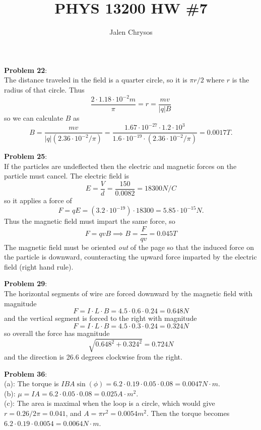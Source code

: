 \documentclass{amsart}
\title{PHYS 13200 HW \#7}
\author{Jalen Chrysos}
\begin{document}
	\maketitle
	
	\textbf{Problem 22}:\\
	
	The distance traveled in the field is a quarter circle, so it is $\pi r / 2$ where $r$ is the radius of that circle. Thus
	$$
	\frac{2\cdot 1.18\cdot 10^{-2} m}{\pi} = r = \frac{m v }{|q| B}
	$$
	so we can calculate $B$ as 
	$$
	B = \frac{mv}{|q| (2.36 \cdot 10^{-2} / \pi)} = \frac{1.67 \cdot 10^{-27} \cdot 1.2 \cdot 10^3}{1.6\cdot 10^{-19} \cdot (2.36 \cdot 10^{-2} / \pi)} = 0.0017 T.
	$$
	
	\textbf{Problem 25}:\\
	
	If the particles are undeflected then the electric and magnetic forces on the particle must cancel. The electric field is 
	$$
	E = \frac{V}{d} = \frac{150}{0.0082} = 18300 N/C
	$$
	so it applies a force of 
	$$
	F = qE = (3.2 \cdot 10^{-19})\cdot 18300 = 5.85 \cdot 10^{-15} N.
	$$
	Thus the magnetic field must impart the same force, so 
	$$
	F = qvB \implies B = \frac{F}{qv} = 0.045 T
	$$
	The magnetic field must be oriented \textit{out} of the page so that the induced force on the particle is downward, counteracting the upward force imparted by the electric field (right hand rule).
	
	\textbf{Problem 29}:\\
	
	The horizontal segments of wire are forced downward by the magnetic field with magnitude 
	$$
	F = I \cdot L \cdot B = 4.5 \cdot 0.6 \cdot 0.24 = 0.648 N
	$$
	and the vertical segment is forced to the right with magnitude
	$$
	F = I \cdot L \cdot B = 4.5 \cdot 0.3 \cdot 0.24 = 0.324 N
	$$
	so overall the force has magnitude 
	$$
	\sqrt{0.648^2 + 0.324^2} = 0.724 N
	$$
	and the direction is 26.6 degrees clockwise from the right.
	
	\textbf{Problem 36}:\\
	
	(a): The torque is $IBA\sin(\phi) = 6.2 \cdot 0.19 \cdot 0.05\cdot 0.08 = 0.0047 N\cdot m$.\\
	
	(b): $\mu = IA = 6.2 \cdot 0.05 \cdot 0.08 = 0.025 A \cdot m^2$.\\
	
	(c): The area is maximal when the loop is a circle, which would give $r=0.26/2\pi = 0.041$, and $A=\pi r^2 = 0.0054 m^2$. Then the torque becomes $6.2\cdot 0.19\cdot 0.0054 = 0.0064 N\cdot m$.\\
	
\end{document}
